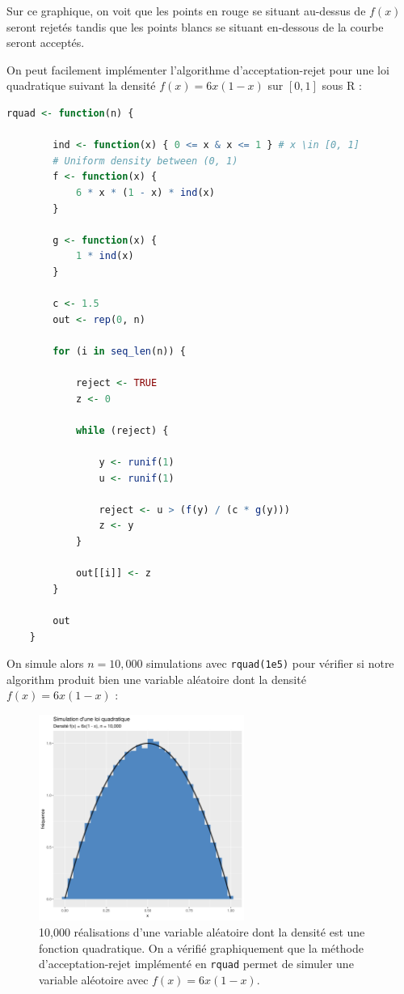 \documentclass[10pt]{article} %
\begin{document}
Sur ce graphique, on voit que les points en rouge se situant au-dessus de $f(x)$ seront rejetés tandis que les points blancs se situant en-dessous de la courbe seront acceptés.

On peut facilement implémenter l'algorithme d'acceptation-rejet pour une loi quadratique suivant la densité $f(x) = 6x(1 - x)$ sur $[0, 1]$ sous R :
\begin{lstlisting}[language=R]
    rquad <- function(n) {

        ind <- function(x) { 0 <= x & x <= 1 } # x \in [0, 1]
        # Uniform density between (0, 1)
        f <- function(x) {
            6 * x * (1 - x) * ind(x)
        }

        g <- function(x) {
            1 * ind(x)
        }

        c <- 1.5
        out <- rep(0, n)

        for (i in seq_len(n)) {

            reject <- TRUE
            z <- 0

            while (reject) {

                y <- runif(1)
                u <- runif(1)

                reject <- u > (f(y) / (c * g(y)))
                z <- y
            }

            out[[i]] <- z
        }

        out
    }
\end{lstlisting}

On simule alors $n = 10,000$ simulations avec \texttt{rquad(1e5)} pour vérifier si notre algorithm produit bien une variable aléatoire dont la densité
$f(x) = 6x(1 - x)$ :

\begin{figure}[h!]
    \centering
    \includegraphics[width=0.6\textwidth]{media/rquad_sim.png}
    \caption{10,000 réalisations d'une variable aléatoire dont la densité est une fonction quadratique. On a vérifié graphiquement que la méthode d'acceptation-rejet implémenté en \texttt{rquad}
    permet de simuler une variable aléotoire avec $f(x) = 6x(1 - x)$.}
\end{figure}
\end{document}
